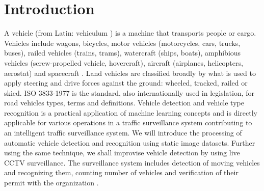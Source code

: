 \chapter[Introduction]{Introduction}

\regularsection
\headerregularsection

\updatemylof %

\begin{sloppypar} %



A vehicle (from Latin: vehiculum \cite{vehicleDef}) is a machine that transports people or cargo. Vehicles include wagons, bicycles, motor vehicles (motorcycles, cars, trucks, buses), railed vehicles (trains, trams), watercraft (ships, boats), amphibious vehicles (screw-propelled vehicle, hovercraft), aircraft (airplanes, helicopters, aerostat) and spacecraft \cite{wikipediaVehicle}. Land vehicles are classified broadly by what is used to apply steering and drive forces against the ground: wheeled, tracked, railed or skied. ISO 3833-1977 is the standard, also internationally used in legislation, for road vehicles types, terms and definitions. Vehicle detection and vehicle type recognition is a practical application of machine learning concepts and is directly applicable for various operations in a traffic surveillance system contributing to an intelligent traffic surveillance system. We will introduce the processing of automatic vehicle detection and recognition using static image datasets. Further using the same technique, we shall improvise vehicle detection by using live CCTV surveillance. The surveillance system includes detection of moving vehicles and recognizing them, counting number of vehicles and verification of their permit with the organization \cite{SriashikaAddala2020}.


\end{sloppypar}

